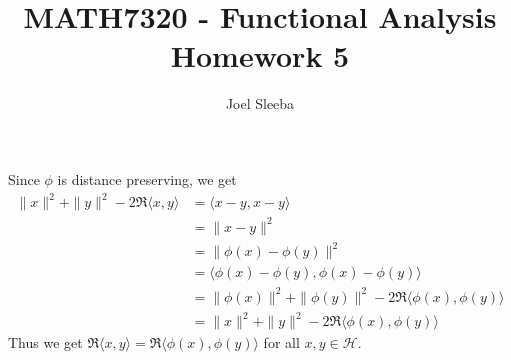 \documentclass[12pt]{exam}
\theoremstyle{plain} %
\theoremstyle{definition} %
\theoremstyle{remark} %
\begin{document}
\title{MATH7320 - Functional Analysis \\ Homework 5}

\author{
  Joel Sleeba \\
}

\maketitle
\printanswers
\unframedsolutions

\begin{questions}

  \question
  \begin{solution}
    Since $\phi$ is distance preserving, we get
    \begin{align*}
      \|x\|^2 + \|y\|^2 - 2 \Re \langle x , y \rangle
      &=\langle x-y, x-y \rangle  \\
      &= \|x -y\|^2 \\
      &= \|\phi(x) - \phi(y)\|^2 \\
      &= \langle \phi(x) - \phi(y) ,  \phi(x) - \phi(y) \rangle \\
      &= \|\phi(x)\|^2 + \|\phi(y)\|^2 - 2 \Re \langle \phi(x) ,
      \phi(y) \rangle \\
      &=  \|x\|^2 +  \|y\|^2 - 2 \Re \langle \phi(x) ,  \phi(y) \rangle
    \end{align*}
    Thus we get $\Re \langle x , y \rangle  = \Re \langle \phi(x) ,
    \phi(y) \rangle $ for all $x, y \in \mathcal{H}$.


\end{solution}
\end{questions}
\end{document}
